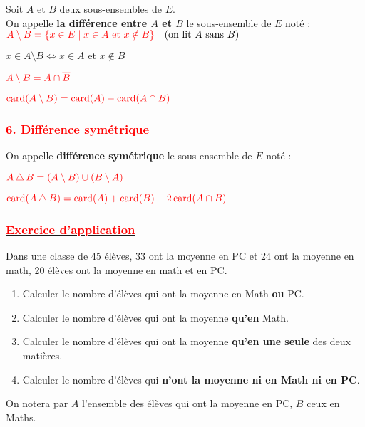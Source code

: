 \documentclass[a4paper,12pt]{article}
\begin{document}
Soit $A$ et $B$ deux sous-ensembles de $E$.\\
On appelle \textbf{la différence entre $A$ et $B$} le sous-ensemble de $E$ noté :\\

\( \textcolor{red}{A \setminus B = \{ x \in E \mid x \in A \text{ et } x \notin B \}} \quad \text{(on lit $A$ sans $B$)} \)

\(x \in A \setminus B \Leftrightarrow x \in A \text{ et } x \notin B\)

\(\textcolor{red}{A \setminus B = A \cap \overline{B}}\)

\(\textcolor{red}{\text{card}(A \setminus B) = \text{card}(A) - \text{card}(A \cap B)}\)

\subsubsection*{\underline{\textcolor{red}{6. Différence symétrique}}}

On appelle \textbf{différence symétrique} le sous-ensemble de $E$ noté :

\(\textcolor{red}{A \, \triangle \, B = (A \setminus B) \cup (B \setminus A)}\)

\(\textcolor{red}{\text{card}(A \, \triangle \, B) = \text{card}(A) + \text{card}(B) - 2 \, \text{card}(A \cap B)}\)

\subsubsection*{\underline{\textcolor{red}{Exercice d'application}}}

Dans une classe de 45 élèves, 33 ont la moyenne en PC et 24 ont la moyenne en math, 20 élèves ont la moyenne en math et en PC.

\begin{enumerate}
    \item Calculer le nombre d’élèves qui ont la moyenne en Math \textbf{ou} PC.
    \item Calculer le nombre d’élèves qui ont la moyenne \textbf{qu’en} Math.
    \item Calculer le nombre d’élèves qui ont la moyenne \textbf{qu’en une seule} des deux matières.
    \item Calculer le nombre d’élèves qui \textbf{n’ont la moyenne ni en Math ni en PC}.
\end{enumerate}

On notera par $A$ l’ensemble des élèves qui ont la moyenne en PC, $B$ ceux en Maths.
\end{document}
